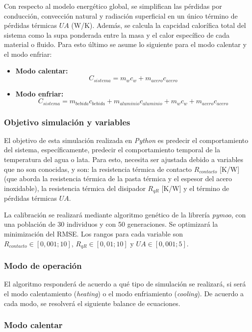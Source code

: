 \documentclass[12pt, a4paper]{article}
\begin{document}
Con respecto al modelo energético global, se simplifican las pérdidas por conducción, convección natural y radiación superficial en un único término de pérdidas térmicas $UA$ (W/K). Además, se calcula la capcidad calorífica total del sistema como la supa ponderada entre la masa y el calor específico de cada material o fluido. Para esto último se asume lo siguiente para el modo calentar y el modo enfriar:

\begin{itemize}
    \item \textbf{Modo calentar:}
    $$ C_{sistema} = m_w c_{w} + m_{acero} c_{acero} $$
    \item \textbf{Modo enfriar:}
    $$ C_{sistema} = m_{bebida} c_{bebida} + m_{aluminio} c_{aluminio} + m_w c_{w} + m_{acero} c_{acero} $$
\end{itemize}

\subsubsection{Objetivo simulación y variables}

El objetivo de esta simulación realizada en \textit{Python} es predecir el comportamiento del sistema, específicamente, predecir el comportamiento temporal de la temperatura del agua o lata. Para esto, necesita ser ajustada debido a variables que no son conocidas, y son: la resistencia térmica de contacto $R_{contacto}$ [K/W] (que aborda la resistencia térmica de la pasta térmica y el espesor del acero inoxidable), la resistencia térmica del disipador $R_{qR}$ [K/W] y el término de pérdidas térmicas $UA$.

La calibración se realizará mediante algoritmo genético de la librería \textit{pymoo}, con una población de 30 individuos y con 50 generaciones. Se optimizará la minimización del RMSE. Los rangos para cada variable son $R_{contacto} \in [0,001; 10]$, $R_{qR} \in [0,01;10]$ y $UA \in [0,001;5]$.

\subsubsection{Modo de operación}

El algoritmo responderá de acuerdo a qué tipo de simulación se realizará, si será el modo calentamiento (\textit{heating}) o el modo enfriamiento (\textit{cooling}). De acuerdo a cada modo, se resolverá el siguiente balance de ecuaciones.

\subsubsection*{Modo calentar}
\end{document}
